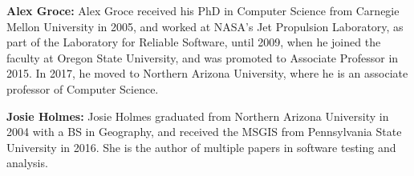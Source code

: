 \documentclass{article}
\begin{document}
{\bf Alex Groce:} Alex Groce received his PhD in Computer Science from Carnegie Mellon University in 2005, and worked at NASA's Jet Propulsion Laboratory, as part of the Laboratory for Reliable Software, until 2009, when he joined the faculty at Oregon State University, and was promoted to Associate Professor in 2015.  In 2017, he moved to Northern Arizona University, where he is an associate professor of Computer Science.

{\bf Josie Holmes:}  Josie Holmes graduated from Northern Arizona University in 2004 with a BS in Geography, and received the MSGIS from Pennsylvania State University in 2016.  She is the author of multiple papers in software testing and analysis.
\end{document}
